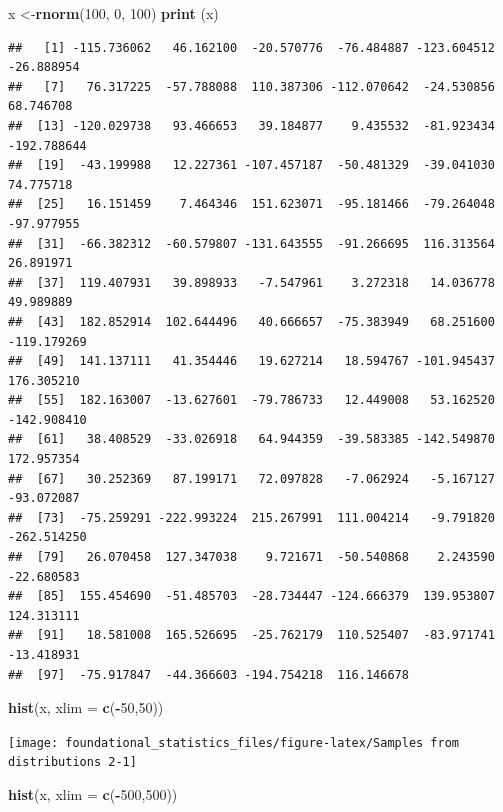 \documentclass[]{book}
\newenvironment{Shaded}{\begin{snugshade}}{\end{snugshade}}
\newcommand{\DataTypeTok}[1]{\textcolor[rgb]{0.13,0.29,0.53}{#1}}
\newcommand{\DecValTok}[1]{\textcolor[rgb]{0.00,0.00,0.81}{#1}}
\newcommand{\KeywordTok}[1]{\textcolor[rgb]{0.13,0.29,0.53}{\textbf{#1}}}
\newcommand{\NormalTok}[1]{#1}
\newcommand{\OperatorTok}[1]{\textcolor[rgb]{0.81,0.36,0.00}{\textbf{#1}}}
\begin{document}
\begin{Shaded}
\begin{Highlighting}[]
\NormalTok{x <-}\KeywordTok{rnorm}\NormalTok{(}\DecValTok{100}\NormalTok{, }\DecValTok{0}\NormalTok{, }\DecValTok{100}\NormalTok{)}
\KeywordTok{print}\NormalTok{ (x)}
\end{Highlighting}
\end{Shaded}

\begin{verbatim}
##   [1] -115.736062   46.162100  -20.570776  -76.484887 -123.604512  -26.888954
##   [7]   76.317225  -57.788088  110.387306 -112.070642  -24.530856   68.746708
##  [13] -120.029738   93.466653   39.184877    9.435532  -81.923434 -192.788644
##  [19]  -43.199988   12.227361 -107.457187  -50.481329  -39.041030   74.775718
##  [25]   16.151459    7.464346  151.623071  -95.181466  -79.264048  -97.977955
##  [31]  -66.382312  -60.579807 -131.643555  -91.266695  116.313564   26.891971
##  [37]  119.407931   39.898933   -7.547961    3.272318   14.036778   49.989889
##  [43]  182.852914  102.644496   40.666657  -75.383949   68.251600 -119.179269
##  [49]  141.137111   41.354446   19.627214   18.594767 -101.945437  176.305210
##  [55]  182.163007  -13.627601  -79.786733   12.449008   53.162520 -142.908410
##  [61]   38.408529  -33.026918   64.944359  -39.583385 -142.549870  172.957354
##  [67]   30.252369   87.199171   72.097828   -7.062924   -5.167127  -93.072087
##  [73]  -75.259291 -222.993224  215.267991  111.004214   -9.791820 -262.514250
##  [79]   26.070458  127.347038    9.721671  -50.540868    2.243590  -22.680583
##  [85]  155.454690  -51.485703  -28.734447 -124.666379  139.953807  124.313111
##  [91]   18.581008  165.526695  -25.762179  110.525407  -83.971741  -13.418931
##  [97]  -75.917847  -44.366603 -194.754218  116.146678
\end{verbatim}

\begin{Shaded}
\begin{Highlighting}[]
\KeywordTok{hist}\NormalTok{(x, }\DataTypeTok{xlim =} \KeywordTok{c}\NormalTok{(}\OperatorTok{-}\DecValTok{50}\NormalTok{,}\DecValTok{50}\NormalTok{))}
\end{Highlighting}
\end{Shaded}

\texttt{[image: foundational\_statistics\_files/figure-latex/Samples from distributions 2-1]}

\begin{Shaded}
\begin{Highlighting}[]
\KeywordTok{hist}\NormalTok{(x, }\DataTypeTok{xlim =} \KeywordTok{c}\NormalTok{(}\OperatorTok{-}\DecValTok{500}\NormalTok{,}\DecValTok{500}\NormalTok{))}
\end{Highlighting}
\end{Shaded}
\end{document}
